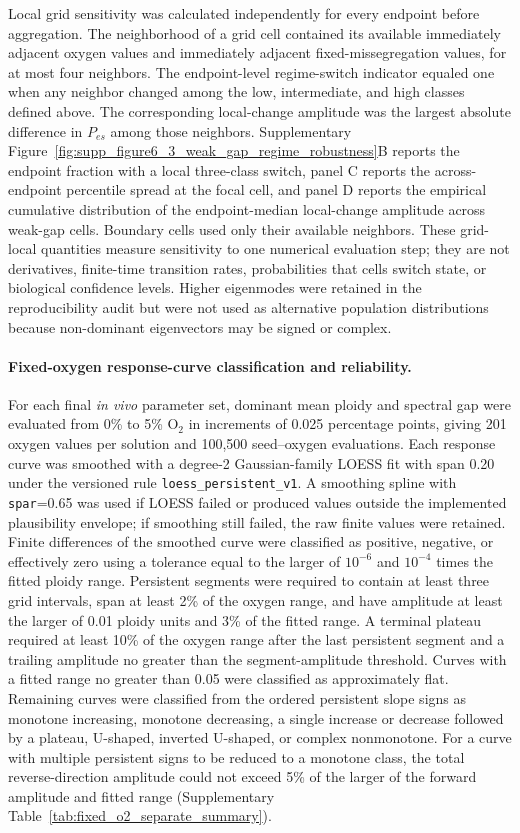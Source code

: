 \documentclass[11pt]{article}
\begin{document}
Local grid sensitivity was calculated independently for every endpoint before aggregation. The neighborhood of a grid cell contained its available immediately adjacent oxygen values and immediately adjacent fixed-missegregation values, for at most four neighbors. The endpoint-level regime-switch indicator equaled one when any neighbor changed among the low, intermediate, and high classes defined above. The corresponding local-change amplitude was the largest absolute difference in $P_{es}$ among those neighbors. Supplementary Figure~\ref{fig:supp_figure6_3_weak_gap_regime_robustness}B reports the endpoint fraction with a local three-class switch, panel C reports the across-endpoint percentile spread at the focal cell, and panel D reports the empirical cumulative distribution of the endpoint-median local-change amplitude across weak-gap cells. Boundary cells used only their available neighbors. These grid-local quantities measure sensitivity to one numerical evaluation step; they are not derivatives, finite-time transition rates, probabilities that cells switch state, or biological confidence levels. Higher eigenmodes were retained in the reproducibility audit but were not used as alternative population distributions because non-dominant eigenvectors may be signed or complex.

\paragraph{Fixed-oxygen response-curve classification and reliability.}
For each final \textit{in vivo} parameter set, dominant mean ploidy and spectral gap were evaluated from 0\% to 5\% O$_2$ in increments of 0.025 percentage points, giving 201 oxygen values per solution and 100,500 seed--oxygen evaluations. Each response curve was smoothed with a degree-2 Gaussian-family LOESS fit with span 0.20 under the versioned rule \texttt{loess\_persistent\_v1}. A smoothing spline with \texttt{spar}=0.65 was used if LOESS failed or produced values outside the implemented plausibility envelope; if smoothing still failed, the raw finite values were retained. Finite differences of the smoothed curve were classified as positive, negative, or effectively zero using a tolerance equal to the larger of $10^{-6}$ and $10^{-4}$ times the fitted ploidy range. Persistent segments were required to contain at least three grid intervals, span at least 2\% of the oxygen range, and have amplitude at least the larger of 0.01 ploidy units and 3\% of the fitted range. A terminal plateau required at least 10\% of the oxygen range after the last persistent segment and a trailing amplitude no greater than the segment-amplitude threshold. Curves with a fitted range no greater than 0.05 were classified as approximately flat. Remaining curves were classified from the ordered persistent slope signs as monotone increasing, monotone decreasing, a single increase or decrease followed by a plateau, U-shaped, inverted U-shaped, or complex nonmonotone. For a curve with multiple persistent signs to be reduced to a monotone class, the total reverse-direction amplitude could not exceed 5\% of the larger of the forward amplitude and fitted range (Supplementary Table~\ref{tab:fixed_o2_separate_summary}).
\end{document}

